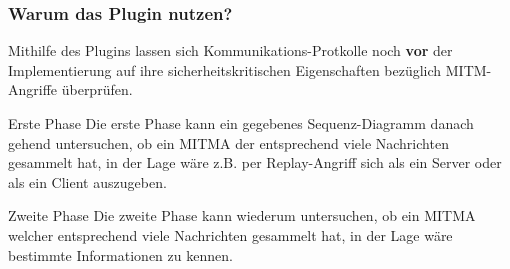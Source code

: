 \begin{frame}[c]

	\frametitle{Warum das Plugin nutzen?}

	Mithilfe des Plugins lassen sich Kommunikations-Protkolle noch \textbf{vor} der Implementierung auf 
	ihre sicherheitskritischen Eigenschaften bezüglich MITM-Angriffe überprüfen. 

	\begin{block}{Erste Phase}
		Die erste Phase kann ein gegebenes Sequenz-Diagramm danach gehend untersuchen, 
		ob ein MITMA der entsprechend viele Nachrichten gesammelt hat, in der Lage 
		wäre z.B. per Replay-Angriff sich als ein Server oder als ein Client auszugeben.
	\end{block}
	
	\begin{block}{Zweite Phase}
		Die zweite Phase kann wiederum untersuchen, ob ein MITMA welcher entsprechend viele Nachrichten 
		gesammelt hat, in der Lage wäre bestimmte Informationen zu kennen. 
	\end{block}
	
	
\end{frame}





